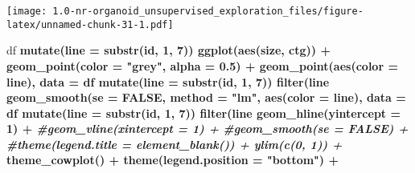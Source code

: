 \documentclass[
]{article}
\newenvironment{Shaded}{\begin{snugshade}}{\end{snugshade}}
\newcommand{\CommentTok}[1]{\textcolor[rgb]{0.56,0.35,0.01}{\textit{#1}}}
\newcommand{\DataTypeTok}[1]{\textcolor[rgb]{0.13,0.29,0.53}{#1}}
\newcommand{\DecValTok}[1]{\textcolor[rgb]{0.00,0.00,0.81}{#1}}
\newcommand{\FloatTok}[1]{\textcolor[rgb]{0.00,0.00,0.81}{#1}}
\newcommand{\KeywordTok}[1]{\textcolor[rgb]{0.13,0.29,0.53}{\textbf{#1}}}
\newcommand{\NormalTok}[1]{#1}
\newcommand{\OperatorTok}[1]{\textcolor[rgb]{0.81,0.36,0.00}{\textbf{#1}}}
\newcommand{\OtherTok}[1]{\textcolor[rgb]{0.56,0.35,0.01}{#1}}
\newcommand{\StringTok}[1]{\textcolor[rgb]{0.31,0.60,0.02}{#1}}
\begin{document}
\texttt{[image: 1.0-nr-organoid\_unsupervised\_exploration\_files/figure-latex/unnamed-chunk-31-1.pdf]}

\begin{Shaded}
\begin{Highlighting}[]
\NormalTok{df }\OperatorTok{%>%}
\StringTok{  }\KeywordTok{mutate}\NormalTok{(}\DataTypeTok{line =} \KeywordTok{substr}\NormalTok{(id, }\DecValTok{1}\NormalTok{, }\DecValTok{7}\NormalTok{)) }\OperatorTok{%>%}
\StringTok{  }\KeywordTok{ggplot}\NormalTok{(}\KeywordTok{aes}\NormalTok{(size, ctg)) }\OperatorTok{+}\StringTok{ }
\StringTok{  }\KeywordTok{geom_point}\NormalTok{(}\DataTypeTok{color =} \StringTok{"grey"}\NormalTok{, }\DataTypeTok{alpha =} \FloatTok{0.5}\NormalTok{) }\OperatorTok{+}\StringTok{ }
\StringTok{  }\KeywordTok{geom_point}\NormalTok{(}\KeywordTok{aes}\NormalTok{(}\DataTypeTok{color =}\NormalTok{ line), }\DataTypeTok{data =}\NormalTok{ df }\OperatorTok{%>%}\StringTok{ }
\StringTok{               }\KeywordTok{mutate}\NormalTok{(}\DataTypeTok{line =} \KeywordTok{substr}\NormalTok{(id, }\DecValTok{1}\NormalTok{, }\DecValTok{7}\NormalTok{)) }\OperatorTok{%>%}\StringTok{ }
\StringTok{               }\KeywordTok{filter}\NormalTok{(line }\OperatorTok{%in%}\StringTok{ }\KeywordTok{c}\NormalTok{(}\StringTok{"D007T01"}\NormalTok{, }\StringTok{"D018T01"}\NormalTok{, }\StringTok{"D019T01"}\NormalTok{))) }\OperatorTok{+}\StringTok{ }
\StringTok{  }\KeywordTok{geom_smooth}\NormalTok{(}\DataTypeTok{se =} \OtherTok{FALSE}\NormalTok{, }
              \DataTypeTok{method =} \StringTok{"lm"}\NormalTok{, }
              \KeywordTok{aes}\NormalTok{(}\DataTypeTok{color =}\NormalTok{ line), }\DataTypeTok{data =}\NormalTok{ df }\OperatorTok{%>%}\StringTok{ }
\StringTok{               }\KeywordTok{mutate}\NormalTok{(}\DataTypeTok{line =} \KeywordTok{substr}\NormalTok{(id, }\DecValTok{1}\NormalTok{, }\DecValTok{7}\NormalTok{)) }\OperatorTok{%>%}\StringTok{ }
\StringTok{               }\KeywordTok{filter}\NormalTok{(line }\OperatorTok{%in%}\StringTok{ }\KeywordTok{c}\NormalTok{(}\StringTok{"D007T01"}\NormalTok{, }\StringTok{"D018T01"}\NormalTok{, }\StringTok{"D019T01"}\NormalTok{))) }\OperatorTok{+}
\StringTok{  }\KeywordTok{geom_hline}\NormalTok{(}\DataTypeTok{yintercept =} \DecValTok{1}\NormalTok{) }\OperatorTok{+}\StringTok{ }
\StringTok{  }\CommentTok{#geom_vline(xintercept = 1) +}
\StringTok{  }\CommentTok{#geom_smooth(se = FALSE) +}
\StringTok{  }\CommentTok{#theme(legend.title = element_blank()) + ylim(c(0, 1)) +}
\StringTok{  }\KeywordTok{theme_cowplot}\NormalTok{() }\OperatorTok{+}\StringTok{ }
\StringTok{  }\KeywordTok{theme}\NormalTok{(}\DataTypeTok{legend.position =} \StringTok{"bottom"}\NormalTok{) }\OperatorTok{+}
}}}}}}}}
\end{Highlighting}
\end{Shaded}
\end{document}
